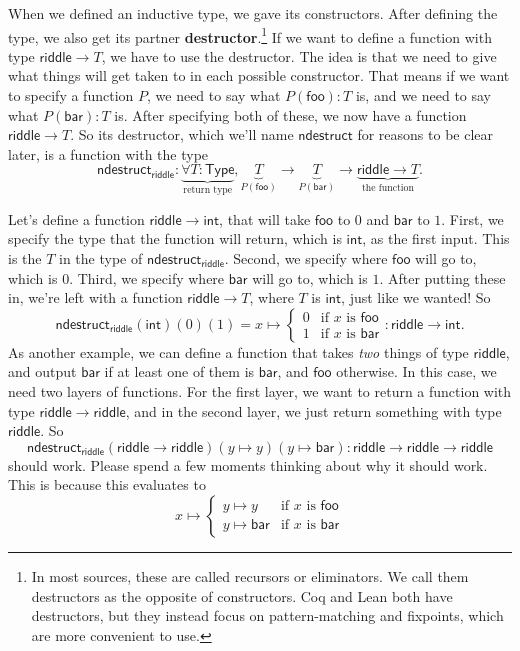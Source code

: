 \documentclass[11pt,paper=letter]{scrartcl}
\renewcommand{\sf}{\mathsf}
\newcommand{\type}{\mathsf{Type}}
\begin{document}
When we defined an inductive type, we gave its constructors. After defining the type, we also get its partner \textbf{destructor}.\footnote{In most sources, these are called recursors or eliminators. We call them destructors as the opposite of constructors. Coq and Lean both have destructors, but they instead focus on pattern-matching and fixpoints, which are more convenient to use.} If we want to define a function with type $\sf{riddle} \to T$, we have to use the destructor. The idea is that we need to give what things will get taken to in each possible constructor. That means if we want to specify a function $P$, we need to say what $P(\sf{foo}) : T$ is, and we need to say what $P(\sf{bar}) : T$ is. After specifying both of these, we now have a function $\sf{riddle} \to T$. So its destructor, which we'll name $\sf{ndestruct}$ for reasons to be clear later, is a function with the type \[
\sf{ndestruct}_{\sf{riddle}}:
\underbrace{\forall T: \type}_{\text{return type}},
\underbrace{T}_{P(\sf{foo})} \to
\underbrace{T}_{P(\sf{bar})} \to
\underbrace{\sf{riddle} \to T}_{\text{the function}}.
\]

Let's define a function $\sf{riddle} \to \sf{int}$, that will take $\sf{foo}$ to $0$ and $\sf{bar}$ to $1$. First, we specify the type that the function will return, which is $\sf{int}$, as the first input. This is the $T$ in the type of $\sf{ndestruct}_\sf{riddle}$. Second, we specify where $\sf{foo}$ will go to, which is $0$. Third, we specify where $\sf{bar}$ will go to, which is $1$. After putting these in, we're left with a function $\sf{riddle} \to T$, where $T$ is $\sf{int}$, just like we wanted! So \[
  \sf{ndestruct}_{\sf{riddle}}(\sf{int})(0)(1) = x \mapsto
  \begin{cases}
  0 & \text{if $x$ is }\sf{foo} \\
  1 & \text{if $x$ is }\sf{bar}
  \end{cases} : \sf{riddle} \to \sf{int}.
\]
As another example, we can define a function that takes \emph{two} things of type $\sf{riddle}$, and output $\sf{bar}$ if at least one of them is $\sf{bar}$, and $\sf{foo}$ otherwise. In this case, we need two layers of functions. For the first layer, we want to return a function with type $\sf{riddle} \to \sf{riddle}$, and in the second layer, we just return something with type $\sf{riddle}$. So \[
  \sf{ndestruct}_\sf{riddle}(
  \sf{riddle} \to \sf{riddle})(
  y \mapsto y)(
  y \mapsto \sf{bar}
  ) : \sf{riddle} \to \sf{riddle} \to \sf{riddle}
\]
should work. Please spend a few moments thinking about why it should work. This is because this evaluates to \[
  x \mapsto
  \begin{cases}
  y \mapsto y & \text{if $x$ is }\sf{foo} \\
  y \mapsto \sf{bar} & \text{if $x$ is }\sf{bar}
  \end{cases}
\]
\end{document}
